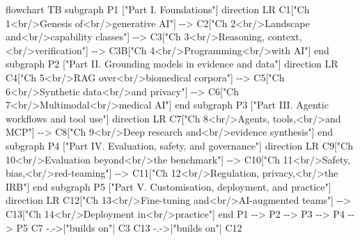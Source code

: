 \documentclass[
  letterpaper,
  11pt]{scrbook}
\newenvironment{Shaded}{\begin{snugshade}}{\end{snugshade}}
\newcommand{\NormalTok}[1]{\textcolor[rgb]{0.00,0.23,0.31}{#1}}
\begin{document}
\begin{Shaded}
\begin{Highlighting}[]
\NormalTok{flowchart TB}
\NormalTok{  subgraph P1 ["Part I. Foundations"]}
\NormalTok{    direction LR}
\NormalTok{    C1["Ch 1\textless{}br/\textgreater{}Genesis of\textless{}br/\textgreater{}generative AI"] {-}{-}\textgreater{} C2["Ch 2\textless{}br/\textgreater{}Landscape and\textless{}br/\textgreater{}capability classes"] {-}{-}\textgreater{} C3["Ch 3\textless{}br/\textgreater{}Reasoning, context,\textless{}br/\textgreater{}verification"] {-}{-}\textgreater{} C3B["Ch 4\textless{}br/\textgreater{}Programming\textless{}br/\textgreater{}with AI"]}
\NormalTok{  end}
\NormalTok{  subgraph P2 ["Part II. Grounding models in evidence and data"]}
\NormalTok{    direction LR}
\NormalTok{    C4["Ch 5\textless{}br/\textgreater{}RAG over\textless{}br/\textgreater{}biomedical corpora"] {-}{-}\textgreater{} C5["Ch 6\textless{}br/\textgreater{}Synthetic data\textless{}br/\textgreater{}and privacy"] {-}{-}\textgreater{} C6["Ch 7\textless{}br/\textgreater{}Multimodal\textless{}br/\textgreater{}medical AI"]}
\NormalTok{  end}
\NormalTok{  subgraph P3 ["Part III. Agentic workflows and tool use"]}
\NormalTok{    direction LR}
\NormalTok{    C7["Ch 8\textless{}br/\textgreater{}Agents, tools,\textless{}br/\textgreater{}and MCP"] {-}{-}\textgreater{} C8["Ch 9\textless{}br/\textgreater{}Deep research and\textless{}br/\textgreater{}evidence synthesis"]}
\NormalTok{  end}
\NormalTok{  subgraph P4 ["Part IV. Evaluation, safety, and governance"]}
\NormalTok{    direction LR}
\NormalTok{    C9["Ch 10\textless{}br/\textgreater{}Evaluation beyond\textless{}br/\textgreater{}the benchmark"] {-}{-}\textgreater{} C10["Ch 11\textless{}br/\textgreater{}Safety, bias,\textless{}br/\textgreater{}red{-}teaming"] {-}{-}\textgreater{} C11["Ch 12\textless{}br/\textgreater{}Regulation, privacy,\textless{}br/\textgreater{}the IRB"]}
\NormalTok{  end}
\NormalTok{  subgraph P5 ["Part V. Customisation, deployment, and practice"]}
\NormalTok{    direction LR}
\NormalTok{    C12["Ch 13\textless{}br/\textgreater{}Fine{-}tuning and\textless{}br/\textgreater{}AI{-}augmented teams"] {-}{-}\textgreater{} C13["Ch 14\textless{}br/\textgreater{}Deployment in\textless{}br/\textgreater{}practice"]}
\NormalTok{  end}
\NormalTok{  P1 {-}{-}\textgreater{} P2 {-}{-}\textgreater{} P3 {-}{-}\textgreater{} P4 {-}{-}\textgreater{} P5}
\NormalTok{  C7 {-}.{-}\textgreater{}|"builds on"| C3}
\NormalTok{  C13 {-}.{-}\textgreater{}|"builds on"| C12}
\end{Highlighting}
\end{Shaded}
\end{document}
